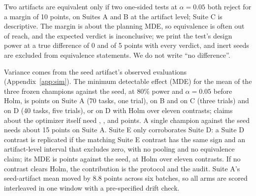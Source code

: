 Two artifacts are equivalent only if two one-sided tests at $\alpha=0.05$ both reject for a margin of 10 points, on Suites A and B at the artifact level; Suite C is descriptive. The margin is about the planning MDE, so equivalence is often out of reach, and the expected verdict is inconclusive; we print the test's design power at a true difference of 0 and of 5 points with every verdict, and inert seeds are excluded from equivalence statements. We do not write ``no difference''.

Variance comes from the seed artifact's observed evaluations (Appendix~\ref{app:sim}). The minimum detectable effect (MDE) for the mean of the three frozen champions against the seed, at 80\% power and $\alpha=0.05$ before Holm, is \mdeACondOne{} points on Suite A (70 tasks, one trial), \mdeBCondThree{} on B and \mdeCCondThree{} on C (three trials) and \mdeDSeed{} on D (40 tasks, five trials), or \mdeDSeedHolm{} on D with Holm over eleven contrasts; claims about the optimizer itself need \mdeAPipeOne{}, \mdeBPipeThree{}, \mdeCPipeThree{} and \mdeDPipe{} points. A single champion against the seed needs about 15 points on Suite A. Suite E only corroborates Suite D: a Suite D contrast is replicated if the matching Suite E contrast has the same sign and an artifact-level interval that excludes zero, with no pooling and no equivalence claim; its MDE is \mdeESeed{} points against the seed, \mdeESeedHolm{} at Holm over eleven contrasts. If no contrast clears Holm, the contribution is the protocol and the audit. Suite A's seed-artifact mean moved by 8.8 points across six batches, so all arms are scored interleaved in one window with a pre-specified drift check.
